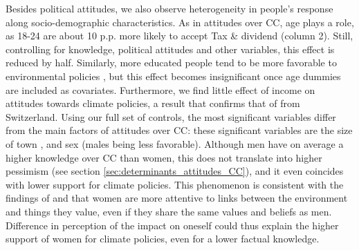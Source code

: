 \documentclass[english,5p,authoryear]{elsarticle}
\begin{document}
Besides political attitudes, we also observe heterogeneity in people's response along socio-demographic characteristics. As in attitudes over CC, age plays a role, as 18-24 are about 10 p.p. more likely to accept Tax \& dividend (column 2). Still, controlling for knowledge, political attitudes and other variables, this effect is reduced by half. Similarly, more educated people tend to be more favorable to environmental policies \citep[as previously found by][]{thalmann_public_2004}, but this effect becomes insignificant once age dummies are included as covariates. Furthermore, we find little effect of income on attitudes towards climate policies, a result that confirms that of \citet{thalmann_public_2004} from Switzerland. Using our full set of controls, the most significant variables differ from the main factors of attitudes over CC: these significant variables are the size of town \citep[city dwellers being more favorable to environmental policies, as in][]{thalmann_public_2004}, and sex (males being less favorable). Although men have on average a higher knowledge over CC than women, this does not translate into higher pessimism (see section \ref{sec:determinants_attitudes_CC}), and it even coincides with lower support for climate policies. This phenomenon is consistent with the findings of \citet{stern_value_1993} and \citet{hampel_gender_1996} that women are more attentive to links between the environment and things they value, even if they share the same values and beliefs as men. Difference in perception of the impact on oneself could thus explain the higher support of women for climate policies, even for a lower factual knowledge.


\end{document}
